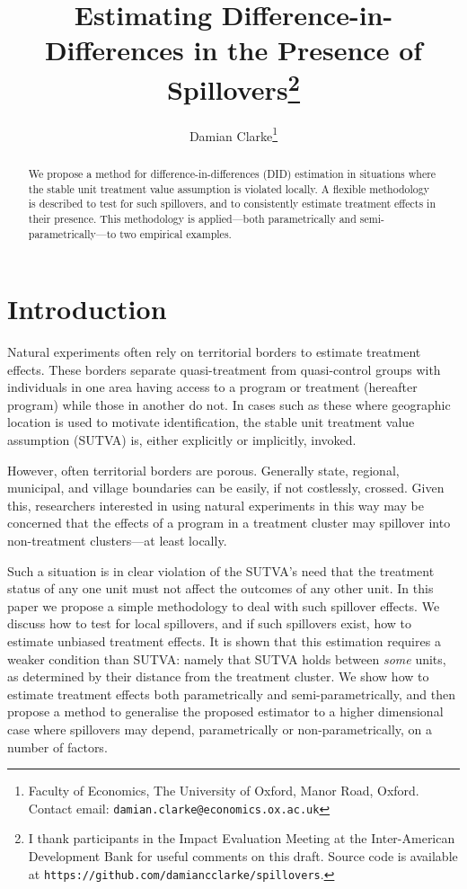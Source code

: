 \documentclass{article}
\title{Estimating Difference-in-Differences in the Presence of Spillovers\footnote{
I thank participants in the Impact Evaluation Meeting at the Inter-American 
Development Bank for useful comments on this draft. Source code is available 
at \texttt{https://github.com/damiancclarke/spillovers}.}}
\author{Damian Clarke\thanks{Faculty of Economics, The University of Oxford,
Manor Road, Oxford. Contact email: \texttt{damian.clarke@economics.ox.ac.uk}}}
\begin{document}
\maketitle

\begin{abstract}
We propose a method for difference-in-differences (DID) estimation in situations 
where the stable unit treatment value assumption is violated locally.  A flexible 
methodology is described to test for such spillovers, and to consistently estimate 
treatment effects in their presence.  This methodology is applied---both 
parametrically and semi-parametrically---to two empirical examples.
\end{abstract}

\section{Introduction}
Natural experiments often rely on territorial borders to estimate treatment 
effects.  These borders separate quasi-treatment from quasi-control groups with
individuals in one area having access to a program or treatment (hereafter 
program) while those in another do not.  In cases such as these where geographic 
location is used to motivate identification, the stable unit treatment value 
assumption (SUTVA) is, either explicitly or implicitly, invoked.

However, often territorial borders are porous.  Generally state, regional,
municipal, and village boundaries can be easily, if not costlessly, crossed.
Given this, researchers interested in using natural experiments in this way may
be concerned that the effects of a program in a treatment cluster may spillover 
into non-treatment clusters---at least locally.

Such a situation is in clear violation of the SUTVA's need that the treatment
status of any one unit must not affect the outcomes of any other unit.  In this 
paper we propose a simple methodology to deal with such spillover effects.  We
discuss how to test for local spillovers, and if such spillovers exist, how to 
estimate unbiased treatment effects.  It is shown that this estimation requires
a weaker condition than SUTVA: namely that SUTVA holds between \emph{some} units, 
as determined by their distance from the treatment cluster.  We show how to 
estimate treatment effects both parametrically and semi-parametrically, and then
propose a method to generalise the proposed estimator to a higher dimensional 
case where spillovers may depend, parametrically or non-parametrically, on a number 
of factors.
\end{document}
